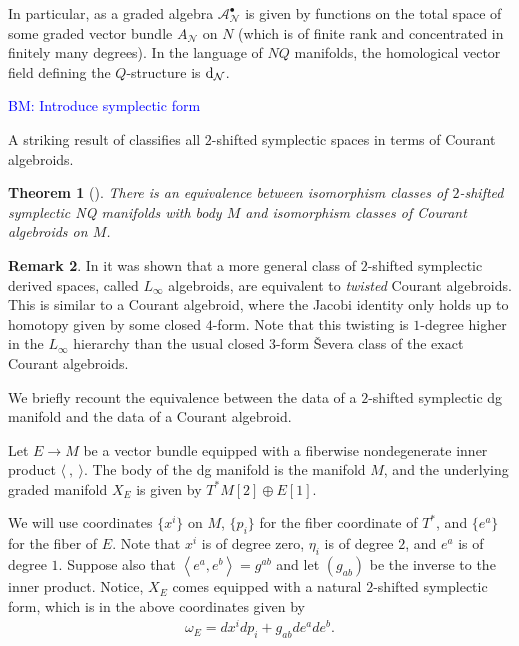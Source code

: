 \documentclass[letterpaper,12pt]{article}
\newcommand{\cN}{\mathcal{N}}
\newcommand{\sA}{\mathcal{A}}
\def\d{{\rm d}}
\newcommand{\la}{\langle}
\newcommand{\ra}{\rangle}
\newcommand{\lara}{\la\ ,\ \ra}
\def\xto{\xrightarrow}
\newtheorem{theorem}{Theorem}[section]
\theoremstyle{definition}
\newtheorem{remark}[theorem]{Remark}
\theoremstyle{remark}
\theoremstyle{examples}
\def\brian{\textcolor{blue}{BM: }\textcolor{blue}}
\begin{document}
In particular, as a graded algebra $\sA^\bullet_\cN$ is given by functions on the total space of some graded vector bundle $A_\cN$ on $N$ (which is of finite rank and concentrated in finitely many degrees). 
In the language of $NQ$ manifolds, the homological vector field defining the $Q$-structure is $\d_\cN$. 

\brian{Introduce symplectic form}

A striking result of \cite{Roytenberg:2002nu} classifies all $2$-shifted symplectic spaces in terms of Courant algebroids. 

\begin{theorem}[\cite{Roytenberg:2002nu}]
There is an equivalence between isomorphism classes of $2$-shifted symplectic NQ manifolds with body $M$ and isomorphism classes of Courant algebroids on $M$.
\end{theorem}

\begin{remark}
In \cite{PymSafronov} it was shown that a more general class of $2$-shifted symplectic derived spaces, called $L_\infty$ algebroids, are equivalent to {\em twisted} Courant algebroids. 
This is similar to a Courant algebroid, where the Jacobi identity only holds up to homotopy given by some closed $4$-form. Note that this twisting is $1$-degree higher in the $L_\infty$ hierarchy than the usual closed $3$-form \v{S}evera class of the exact Courant algebroids.
\end{remark}

We briefly recount the equivalence between the data of a $2$-shifted symplectic dg manifold and the data of a Courant algebroid.

\def\Sym{{\rm Sym}}

Let $E \to M$ be a vector bundle equipped with a fiberwise nondegenerate inner product $\lara$.
The body of the dg manifold is the manifold $M$, and the underlying graded manifold $X_E$ is given by $T^*M [2] \oplus E[1]$. 

We will use coordinates $\{x^i\}$ on $M$, $\{p_i\}$ for the fiber coordinate of $T^*$, and $\{e^a\}$ for the fiber of $E$. 
Note that $x^i$ is of degree zero, $\eta_i$ is of degree $2$, and $e^a$ is of degree $1$.
Suppose also that $\left<e^a, e^b\right> = g^{ab}$ and let $(g_{ab})$ be the inverse to the inner product. 
Notice, $X_E$ comes equipped with a natural $2$-shifted symplectic form, which is in the above coordinates given by 
\begin{align}
\label{eq:omega_E}
\omega_E = d x^i d p_i + g_{ab} d e^a d e^b .
\end{align}
\end{document}
